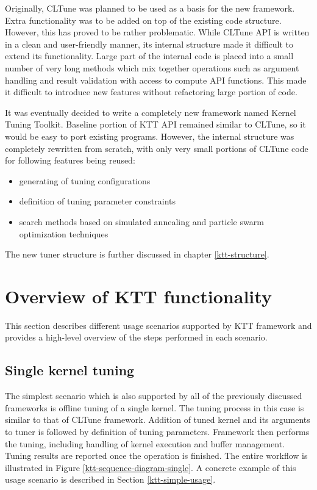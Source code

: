 \documentclass
[
    digital, %
    oneside, %
    table, %
    nolof, %
    nolot, %
    nocover %
]{fithesis3}
\begin{document}
Originally, CLTune was planned to be used as a basis for the new framework. Extra functionality was to be added on top of the existing code structure.
However, this has proved to be rather problematic. While CLTune API is written in a clean and user-friendly manner, its internal structure made it
difficult to extend its functionality. Large part of the internal code is placed into a small number of very long methods which mix together operations
such as argument handling and result validation with access to compute API functions. This made it difficult to introduce new features without refactoring
large portion of code.

It was eventually decided to write a completely new framework named Kernel Tuning Toolkit. Baseline portion of KTT API remained similar to CLTune,
so it would be easy to port existing programs. However, the internal structure was completely rewritten from scratch, with only very small portions
of CLTune code for following features being reused:
\begin{itemize}
    \item generating of tuning configurations
    \item definition of tuning parameter constraints
    \item search methods based on simulated annealing and particle swarm optimization techniques
\end{itemize}
The new tuner structure is further discussed in chapter \ref{ktt-structure}.

\section{Overview of KTT functionality}
This section describes different usage scenarios supported by KTT framework and provides a high-level overview of the steps performed in each scenario.

\subsection{Single kernel tuning}
The simplest scenario which is also supported by all of the previously discussed frameworks is offline tuning of a single kernel. The tuning process in
this case is similar to that of CLTune framework. Addition of tuned kernel and its arguments to tuner is followed by definition of tuning parameters.
Framework then performs the tuning, including handling of kernel execution and buffer management. Tuning results are reported once the operation is
finished. The entire workflow is illustrated in Figure \ref{ktt-sequence-diagram-single}. A concrete example of this usage scenario is described in
Section \ref{ktt-simple-usage}.
\end{document}
